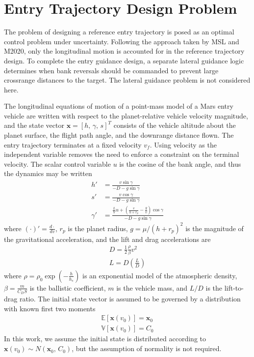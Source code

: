 \documentclass[journal ]{new-aiaa}
\newcommand{\state}{\ensuremath{\mathbf{x}}}
\newcommand{\E}[1]{\mathbb{E}\left[#1\right]}
\newcommand{\V}[1]{\mathbb{V}[#1]}
\newcommand{\mean}{\mathbf{m}}
\newcommand{\cov}{C}
\newcommand{\sample}{\ensuremath{\mathbf{z}}}
\begin{document}

\section*{Entry Trajectory Design Problem}
The problem of designing a reference entry trajectory is posed as an optimal control problem under uncertainty. Following the approach taken by MSL and M2020, only the longitudinal motion is accounted for in the reference trajectory design. To complete the entry guidance design, a separate lateral guidance logic determines when bank reversals should be commanded to prevent large crossrange distances to the target. The lateral guidance problem is not considered here.

The longitudinal equations of motion of a point-mass model of a Mars entry vehicle are written with respect to the planet-relative vehicle velocity magnitude, and the state vector $\state=[h,\,\gamma,\, s]^T$ consists of the vehicle altitude about the planet surface, the flight path angle, and the downrange distance flown. The entry trajectory terminates at a fixed velocity $v_f$. Using velocity as the independent variable removes the need to enforce a constraint on the terminal velocity. The scalar control variable $u$ is the cosine of the bank angle, and thus the dynamics may be written
\begin{align}
h' &= \frac{v\sin\gamma}{-D - g\sin\gamma} \label{eq_dynamics_altitude}\\
s' &= \frac{v\cos\gamma}{-D - g\sin\gamma} \\
\gamma' &= \frac{\frac{L}{V}u + \left(\frac{v}{h+r_p}-\frac{g}{v}\right)\cos\gamma}{-D - g\sin\gamma} \label{eq_dynamics_fpa}
\end{align}
where $(\cdot)' = \frac{d\cdot}{dv}$, $r_p$ is the planet radius, $g=\mu/(h+r_p)^2$ is the magnitude of the gravitational acceleration, and the lift and drag accelerations are
\begin{align}
D = \frac{1}{2}\frac{\rho}{\beta} v^2 \\
L = D(\frac{L}{D})
\end{align}
where $\rho=\rho_0\exp\left(-\frac{h}{h_s}\right)$ is an exponential model of the atmospheric density, $\beta=\frac{m}{C_DS}$ is the ballistic coefficient, $m$ is the vehicle mass, and $L/D$ is the lift-to-drag ratio.
The initial state vector is assumed to be governed by a distribution with known first two moments
 \begin{align}
 \E{\state(v_0)} = \state_0 \label{eq_ic_mean}\\ 
 \V{\state(v_0)} = \cov_0 \label{eq_ic_cov}
 \end{align}
In this work, we assume the initial state is distributed according to $\state(v_0)\sim N(\state_0,\,\cov_0)$, but the assumption of normality is not required.
\end{document}
